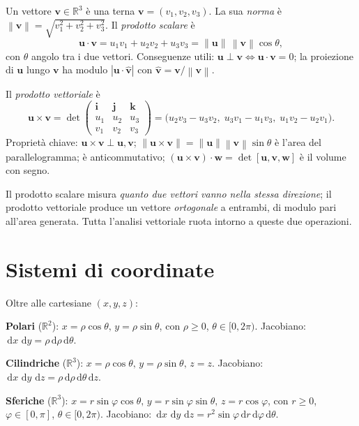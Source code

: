\documentclass[11pt,a4paper,openany]{book}
\theoremstyle{plain}
\theoremstyle{definition}
\theoremstyle{remark}
\newcommand{\R}{\mathbb{R}}
\newcommand{\dd}{\,\mathrm{d}}
\renewcommand{\vec}[1]{\mathbf{#1}}
\newcommand{\norm}[1]{\left\lVert #1 \right\rVert}
\newcommand{\abs}[1]{\left\lvert #1 \right\rvert}
\begin{document}
Un vettore $\vec{v}\in\R^3$ \`e una terna $\vec{v}=(v_1,v_2,v_3)$. La sua
\emph{norma} \`e $\norm{\vec{v}}=\sqrt{v_1^2+v_2^2+v_3^2}$. Il \emph{prodotto
scalare} \`e
\begin{equation}
  \vec{u}\cdot\vec{v}=u_1v_1+u_2v_2+u_3v_3=\norm{\vec{u}}\,\norm{\vec{v}}\cos\theta,
  \label{eq:prodscal}
\end{equation}
con $\theta$ angolo tra i due vettori. Conseguenze utili: $\vec{u}\perp\vec{v}
\iff\vec{u}\cdot\vec{v}=0$; la proiezione di $\vec{u}$ lungo $\vec{v}$ ha modulo
$\abs{\vec{u}\cdot\hat{\vec{v}}}$ con $\hat{\vec{v}}=\vec{v}/\norm{\vec{v}}$.

Il \emph{prodotto vettoriale} \`e
\begin{equation}
  \vec{u}\times\vec{v}=\det\begin{pmatrix}\vec{i}&\vec{j}&\vec{k}\\u_1&u_2&u_3\\v_1&v_2&v_3\end{pmatrix}
  =\bigl(u_2v_3-u_3v_2,\;u_3v_1-u_1v_3,\;u_1v_2-u_2v_1\bigr).
  \label{eq:prodvect}
\end{equation}
Propriet\`a chiave: $\vec{u}\times\vec{v}\perp\vec{u},\vec{v}$;
$\norm{\vec{u}\times\vec{v}}=\norm{\vec{u}}\norm{\vec{v}}\sin\theta$ \`e l'area
del parallelogramma; \`e anticommutativo;
$(\vec{u}\times\vec{v})\cdot\vec{w}=\det[\vec{u},\vec{v},\vec{w}]$ \`e il volume
con segno.

\begin{nota}
Il prodotto scalare misura \emph{quanto due vettori vanno nella stessa direzione};
il prodotto vettoriale produce un vettore \emph{ortogonale} a entrambi, di modulo
pari all'area generata. Tutta l'analisi vettoriale ruota intorno a queste due
operazioni.
\end{nota}

\section{Sistemi di coordinate}

Oltre alle cartesiane $(x,y,z)$:

\textbf{Polari} ($\R^2$): $x=\rho\cos\theta,\,y=\rho\sin\theta$, con $\rho\ge 0$,
$\theta\in[0,2\pi)$. Jacobiano: $\dd x\,\dd y=\rho\dd\rho\dd\theta$.

\textbf{Cilindriche} ($\R^3$): $x=\rho\cos\theta,\,y=\rho\sin\theta,\,z=z$.
Jacobiano: $\dd x\,\dd y\,\dd z=\rho\dd\rho\dd\theta\dd z$.

\textbf{Sferiche} ($\R^3$): $x=r\sin\varphi\cos\theta,\,y=r\sin\varphi\sin\theta,
\,z=r\cos\varphi$, con $r\ge 0$, $\varphi\in[0,\pi]$, $\theta\in[0,2\pi)$.
Jacobiano: $\dd x\,\dd y\,\dd z=r^2\sin\varphi\dd r\dd\varphi\dd\theta$.
\end{document}
